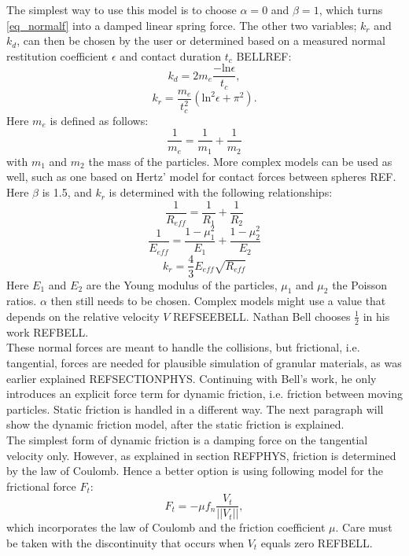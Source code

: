 The simplest way to use this model is to choose $\alpha = 0$ and $\beta = 1$, which turns \eqref{eq_normalf} into a damped linear spring force. The other two variables; $k_r$ and $k_d$, can then be chosen by the user or determined based on a measured normal restitution coefficient $\epsilon$ and contact duration $t_c$ BELLREF:
\begin{equation}
k_d = 2 m_e \frac{- \mathrm{ln} \epsilon}{t_c},
\end{equation}
\begin{equation}
k_r =\frac{m_e}{t_c ^2} (\mathrm{ln}^2 \epsilon + \pi ^2).
\end{equation}
Here $m_e$ is defined as follows:
\begin{equation}
\frac{1}{m_e} = \frac{1}{m_1} + \frac{1}{m_2}
\end{equation}
with $m_1$ and $m_2$ the mass of the particles. More complex models can be used as well, such as one based on Hertz' model for contact forces between spheres REF. Here $\beta$ is 1.5, and $k_r$ is determined with the following relationships:
\begin{equation}
\frac{1}{R_{eff}} = \frac{1}{R_1} + \frac{1}{R_2}
\end{equation}
\begin{equation}
\frac{1}{E_{eff}} = \frac{1 - \mu_{1}^2}{E_1} + \frac{1 - \mu_{2}^2}{E_2}
\end{equation}
\begin{equation}
k_r = \frac{4}{3} E_{eff} \sqrt{R_{eff}}
\end{equation}
Here $E_1$ and $E_2$ are the Young modulus of the particles, $\mu_1$ and $\mu_2$ the Poisson ratios. $\alpha$ then still needs to be chosen. Complex models might use a value that depends on the relative velocity $V$ REFSEEBELL. Nathan Bell chooses $\frac{1}{2}$ in his work REFBELL.\\

These normal forces are meant to handle the collisions, but frictional, i.e. tangential, forces are needed for plausible simulation of granular materials, as was earlier explained REFSECTIONPHYS. Continuing with Bell's work, he only introduces an explicit force term for dynamic friction, i.e. friction between moving particles. Static friction is handled in a different way. The next paragraph will show the dynamic friction model, after the static friction is explained.\\

The simplest form of dynamic friction is a damping force on the tangential velocity only. However, as explained in section REFPHYS, friction is determined by the law of Coulomb. Hence a better option is using following model for the frictional force $F_t$:
\begin{equation}
F_t = - \mu f_n \frac{V_t}{||V_t||},
\end{equation}
which incorporates the law of Coulomb and the friction coefficient $\mu$. Care must be taken with the discontinuity that occurs when $V_t$ equals zero REFBELL.\\

